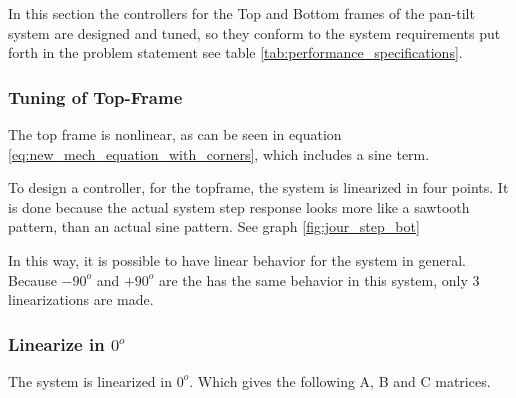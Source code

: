 \documentclass[../../../Main]{subfiles}
\begin{document}
In this section the controllers for the Top and Bottom frames of the pan-tilt system are designed and tuned, so they conform to the system requirements put forth in the problem statement see table \ref{tab:performance_specifications}.

\subsubsection{Tuning of Top-Frame}
\label{sec:top_frame_tuning}
The top frame is nonlinear, as can be seen in equation \eqref{eq:new_mech_equation_with_corners}, which includes a sine term.

To design a controller, for the topframe, the system is linearized in four points. It is done because the actual system step response looks more like a sawtooth pattern, than an actual sine pattern. See graph \ref{fig:jour_step_bot}

In this way, it is possible to have linear behavior for the system in general.
Because $-90^o$ and  $+90^o$ are the has the same behavior in this system, only 3 linearizations are made.

\subsubsection{Linearize in $0^o$}
\label{sec:linearize}
The system is linearized in $0^o$. Which gives the following A, B and C matrices.
\end{document}

